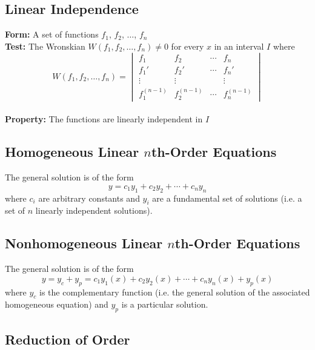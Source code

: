 \documentclass{article}
\begin{document}
\subsection{Linear Independence}

\textbf{Form:} A set of functions $f_1$, $f_2$, $\ldots$, $f_n$ \\ \textbf{Test:} The Wronskian $W(f_1, f_2, \ldots, f_n) \ne 0$ for every $x$ in an interval $I$ where \[W(f_1, f_2, \ldots, f_n) = \begin{vmatrix}
    f_1           & f_2           & \cdots & f_n           \\
    f_1'          & f_2'          & \cdots & f_n'          \\
    \vdots        & \vdots        &        & \vdots        \\
    f_1^{(n - 1)} & f_2^{(n - 1)} & \cdots & f_n^{(n - 1)}
  \end{vmatrix}\] \\ \textbf{Property:} The functions are linearly independent in $I$

\subsection{Homogeneous Linear $n$th-Order Equations}

The general solution is of the form \[y = c_1 y_1 + c_2 y_2 + \cdots + c_n y_n\] where $c_i$ are arbitrary constants and $y_i$ are a fundamental set of solutions (i.e. a set of $n$ linearly independent solutions).

\subsection{Nonhomogeneous Linear $n$th-Order Equations}

The general solution is of the form \[y = y_c + y_p = c_1 y_1(x) + c_2 y_2(x) + \cdots + c_n y_n(x) + y_p(x)\] where $y_c$ is the complementary function (i.e. the general solution of the associated homogeneous equation) and $y_p$ is a particular solution.

\subsection{Reduction of Order}
\end{document}
